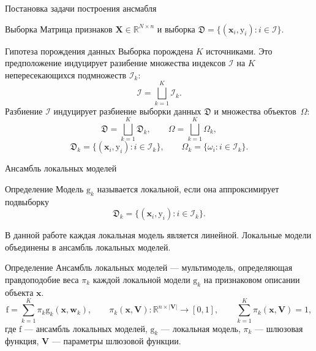 \documentclass[9pt,pdf,hyperref={unicode}]{beamer}
\begin{document}
\begin{frame}{Постановка задачи построения ансмабля}
\begin{block}{Выборка}
Матрица признаков $\mathbf{X} \in \mathbb{R}^{N\times n}$ и выборка $\mathfrak{D} = \{(\mathbf{x}_i, \mathrm{y}_i): i \in \mathcal{I}\}$.
\end{block}
\begin{block}{Гипотеза порождения данных}
Выборка порождена $K$ источниками. Это предположение индуцирует разибение множества индексов $\mathcal{I}$ на $K$ непересекающихся подмножеств $\mathcal{I}_k$:
    \[\mathcal{I} = \bigsqcup_{k=1}^K \mathcal{I}_k.\]
Разбиение $\mathcal{I}$ индуцирует разбиение выборки данных $\mathfrak{D}$ и множества объектов~$\Omega$:
    \[\mathfrak{D} = \bigsqcup_{k=1}^K \mathfrak{D}_k, \qquad \Omega = \bigsqcup_{k=1}^K \Omega_k,\]
    \[\mathfrak{D}_k = \{(\mathbf{x}_i, \mathrm{y}_i): i \in \mathcal{I}_k\}, \qquad \Omega_k = \{\omega_i : i \in \mathcal{I}_k\}.\]
\end{block}
    
\end{frame}


\begin{frame}{Ансамбль локальных моделей}
    \begin{block}{Определение}
            Модель $ \mathrm{g}_k$ называется локальной, если она аппроксимирует подвыборку 
            \[\mathfrak{D}_k = \{(\mathbf{x}_i, \mathrm{y}_i): i \in \mathcal{I}_k\}.\]
    
    \end{block}

В данной работе каждая локальная модель является линейной. Локальные модели объединены в ансамбль локальных моделей. 
    \begin{block}{Определение}
        Ансамбль локальных моделей — мультимодель, определяющая правдоподобие веса $\pi_k$ каждой локальной модели $\mathrm{g}_k$ на признаковом описании объекта $\mathbf{x}$.
\[\mathrm{f} = \sum\limits_{k=1}^K \pi_k \mathrm{g}_k(\mathbf{x}, \mathbf{w}_k), \qquad \pi_k(\mathbf{x}, \mathbf{V}): \mathbb{R}^{n\times |\mathbf{V}|}\rightarrow [0,1], \qquad \sum_{k=1}^K \pi_k(\mathbf{x}, \mathbf{V}) = 1, \]
где $\mathrm{f}$ --- ансамбль локальных моделей, $\mathrm{g}_k$ --- локальная модель,  $\pi_k$ --- шлюзовая функция, $\mathbf{V}$ --- параметры шлюзовой функции.

    \end{block}
\end{frame}
\end{document}

